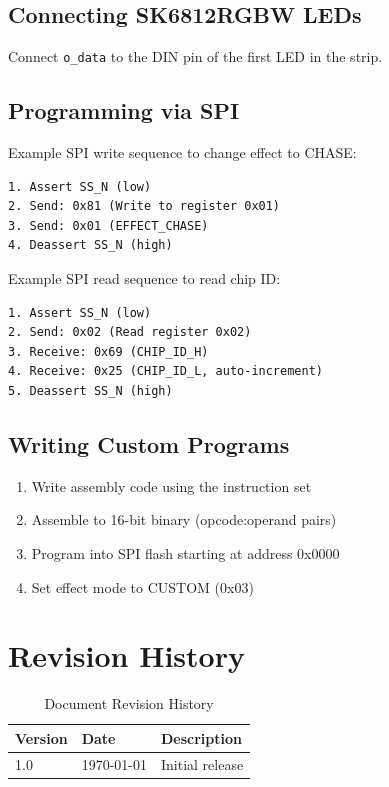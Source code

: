 \documentclass[11pt,a4paper]{article}
\begin{document}
\subsection{Connecting SK6812RGBW LEDs}

Connect \texttt{o\_data} to the DIN pin of the first LED in the strip.

\subsection{Programming via SPI}

Example SPI write sequence to change effect to CHASE:

\begin{lstlisting}[language={},caption={SPI Write Example}]
1. Assert SS_N (low)
2. Send: 0x81 (Write to register 0x01)
3. Send: 0x01 (EFFECT_CHASE)
4. Deassert SS_N (high)
\end{lstlisting}

Example SPI read sequence to read chip ID:

\begin{lstlisting}[language={},caption={SPI Read Example}]
1. Assert SS_N (low)
2. Send: 0x02 (Read register 0x02)
3. Receive: 0x69 (CHIP_ID_H)
4. Receive: 0x25 (CHIP_ID_L, auto-increment)
5. Deassert SS_N (high)
\end{lstlisting}

\subsection{Writing Custom Programs}

\begin{enumerate}[noitemsep]
    \item Write assembly code using the instruction set
    \item Assemble to 16-bit binary (opcode:operand pairs)
    \item Program into SPI flash starting at address 0x0000
    \item Set effect mode to CUSTOM (0x03)
\end{enumerate}

\section{Revision History}

\begin{table}[H]
\centering
\caption{Document Revision History}
\begin{tabular}{@{}lll@{}}
\toprule
\textbf{Version} & \textbf{Date} & \textbf{Description} \\
\midrule
1.0 & \today & Initial release \\
\bottomrule
\end{tabular}
\end{table}
\end{document}
